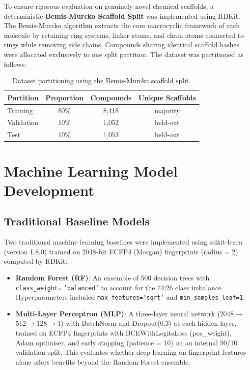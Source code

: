 To ensure rigorous evaluation on genuinely novel chemical scaffolds, a deterministic
\textbf{Bemis-Murcko Scaffold Split} was implemented using RDKit. The Bemis-Murcko
algorithm extracts the core macrocyclic framework of each molecule by retaining ring
systems, linker atoms, and chain atoms connected to rings while removing side chains.
Compounds sharing identical scaffold hashes were allocated exclusively to one split
partition. The dataset was partitioned as follows:

\begin{table}[H]
\centering
\caption{Dataset partitioning using the Bemis-Murcko scaffold split.}
\label{tab:split}
\begin{tabular}{lccc}
\toprule
\textbf{Partition} & \textbf{Proportion} & \textbf{Compounds} & \textbf{Unique Scaffolds} \\
\midrule
Training   & 80\% & 8,418  & majority \\
Validation & 10\% & 1,052  & held-out \\
Test       & 10\% & 1,053  & held-out \\
\bottomrule
\end{tabular}
\end{table}

\section{Machine Learning Model Development}

\subsection{Traditional Baseline Models}

Two traditional machine learning baselines were implemented using
scikit-learn (version 1.8.0) trained on 2048-bit ECFP4 (Morgan) fingerprints
(radius = 2) computed by RDKit:

\begin{itemize}
    \item \textbf{Random Forest (RF)}: An ensemble of 500 decision trees with
          \texttt{class\_weight=} \texttt{'balanced'} to account for the 74:26 class imbalance.
          Hyperparameters included \texttt{max\_features='sqrt'} and
          \texttt{min\_samples\_leaf=1}.
    \item \textbf{Multi-Layer Perceptron (MLP)}: A three-layer neural network
          (2048$\to$512$\to$128$\to$1) with BatchNorm and Dropout(0.3) at each hidden
          layer, trained on ECFP4 fingerprints with BCEWithLogitsLoss (pos\_weight),
          Adam optimiser, and early stopping (patience = 10) on an internal 90/10
          validation split. This evaluates whether deep learning on fingerprint features
          alone offers benefits beyond the Random Forest ensemble.
\end{itemize}


